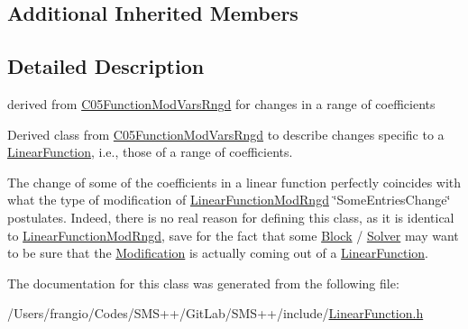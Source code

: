 \subsection*{Additional Inherited Members}


\subsection{Detailed Description}
derived from \mbox{\hyperlink{class_s_m_spp__di__unipi__it_1_1_c05_function_mod_vars_rngd}{C05\+Function\+Mod\+Vars\+Rngd}} for changes in a range of coefficients 

Derived class from \mbox{\hyperlink{class_s_m_spp__di__unipi__it_1_1_c05_function_mod_vars_rngd}{C05\+Function\+Mod\+Vars\+Rngd}} to describe changes specific to a \mbox{\hyperlink{class_s_m_spp__di__unipi__it_1_1_linear_function}{Linear\+Function}}, i.\+e., those of a range of coefficients.

The change of some of the coefficients in a linear function perfectly coincides with what the type of modification of \mbox{\hyperlink{class_s_m_spp__di__unipi__it_1_1_linear_function_mod_rngd}{Linear\+Function\+Mod\+Rngd}} \char`\"{}\+Some\+Entries\+Change\char`\"{} postulates. Indeed, there is no real reason for defining this class, as it is identical to \mbox{\hyperlink{class_s_m_spp__di__unipi__it_1_1_linear_function_mod_rngd}{Linear\+Function\+Mod\+Rngd}}, save for the fact that some \mbox{\hyperlink{class_s_m_spp__di__unipi__it_1_1_block}{Block}} / \mbox{\hyperlink{class_s_m_spp__di__unipi__it_1_1_solver}{Solver}} may want to be sure that the \mbox{\hyperlink{class_s_m_spp__di__unipi__it_1_1_modification}{Modification}} is actually coming out of a \mbox{\hyperlink{class_s_m_spp__di__unipi__it_1_1_linear_function}{Linear\+Function}}. 

The documentation for this class was generated from the following file\+:\begin{DoxyCompactItemize}
\item 
/\+Users/frangio/\+Codes/\+S\+M\+S++/\+Git\+Lab/\+S\+M\+S++/include/\mbox{\hyperlink{_linear_function_8h}{Linear\+Function.\+h}}\end{DoxyCompactItemize}
